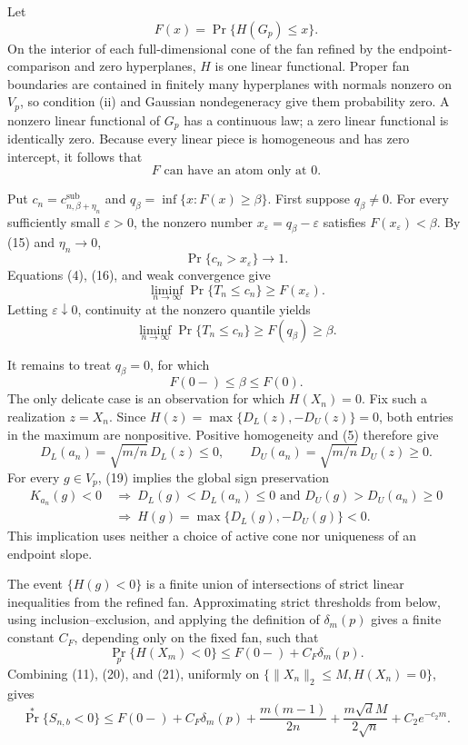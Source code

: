 Let
\[
F(x)=\Pr\{H(G_p)\leq x\}.
\]
On the interior of each full-dimensional cone of the fan refined by the endpoint-comparison and zero hyperplanes, \(H\) is one linear functional.  Proper fan boundaries are contained in finitely many hyperplanes with normals nonzero on \(V_p\), so condition (ii) and Gaussian nondegeneracy give them probability zero.  A nonzero linear functional of \(G_p\) has a continuous law; a zero linear functional is identically zero.  Because every linear piece is homogeneous and has zero intercept, it follows that
\[
F\text{ can have an atom only at }0.
\tag{16}
\]

Put \(c_n=c^{\mathrm{sub}}_{n,\beta+\eta_n}\) and \(q_\beta=\inf\{x:F(x)\geq\beta\}\).  First suppose \(q_\beta\neq0\).  For every sufficiently small \(\varepsilon>0\), the nonzero number \(x_\varepsilon=q_\beta-\varepsilon\) satisfies \(F(x_\varepsilon)<\beta\).  By (15) and \(\eta_n\to0\),
\[
\Pr\{c_n>x_\varepsilon\}\longrightarrow1.
\]
Equations (4), (16), and weak convergence give
\[
\liminf_{n\to\infty}\Pr\{T_n\leq c_n\}
\geq F(x_\varepsilon).
\]
Letting \(\varepsilon\downarrow0\), continuity at the nonzero quantile yields
\[
\liminf_{n\to\infty}\Pr\{T_n\leq c_n\}
\geq F(q_\beta)\geq\beta.
\tag{17}
\]

It remains to treat \(q_\beta=0\), for which
\[
F(0-)\leq\beta\leq F(0).
\tag{18}
\]
The only delicate case is an observation for which \(H(X_n)=0\).  Fix such a realization \(z=X_n\).  Since \(H(z)=\max\{D_L(z),-D_U(z)\}=0\), both entries in the maximum are nonpositive.  Positive homogeneity and (5) therefore give
\[
D_L(a_n)=\sqrt{m/n}\,D_L(z)\leq0,
\qquad
D_U(a_n)=\sqrt{m/n}\,D_U(z)\geq0.
\tag{19}
\]
For every \(g\in V_p\), (19) implies the global sign preservation
\[
\begin{aligned}
K_{a_n}(g)<0
&\ \Longrightarrow\ D_L(g)<D_L(a_n)\leq0
\text{ and }D_U(g)>D_U(a_n)\geq0\\
&\ \Longrightarrow\ H(g)=\max\{D_L(g),-D_U(g)\}<0.
\end{aligned}
\tag{20}
\]
This implication uses neither a choice of active cone nor uniqueness of an endpoint slope.

The event \(\{H(g)<0\}\) is a finite union of intersections of strict linear inequalities from the refined fan.  Approximating strict thresholds from below, using inclusion--exclusion, and applying the definition of \(\delta_m(p)\) gives a finite constant \(C_F\), depending only on the fixed fan, such that
\[
\Pr_p\{H(X_m)<0\}\leq F(0-)+C_F\delta_m(p).
\tag{21}
\]
Combining (11), (20), and (21), uniformly on \(\{\|X_n\|_2\leq M,H(X_n)=0\}\), gives
\[
\Pr^*\{S_{n,b}<0\}
\leq F(0-)+C_F\delta_m(p)
+\frac{m(m-1)}{2n}+\frac{m\sqrt d M}{2\sqrt n}+C_2e^{-c_2m}.
\tag{22}
\]


